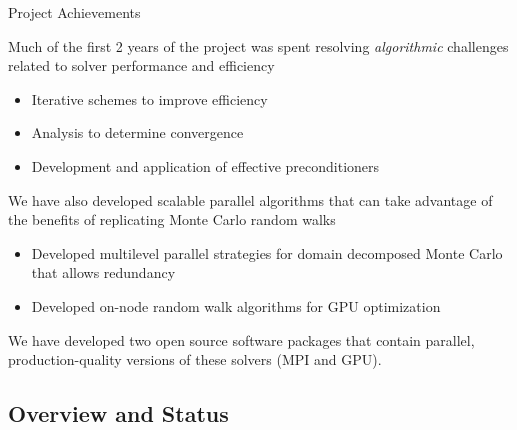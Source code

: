 \documentclass{beamer}
\begin{document}

\begin{frame}{Project Achievements}

  Much of the first 2 years of the project was spent resolving
  \textit{algorithmic} challenges related to solver performance and efficiency
  \begin{itemize}
  \item Iterative schemes to improve efficiency
  \item Analysis to determine convergence
  \item Development and application of effective preconditioners
  \end{itemize}

  \vfill

  We have also developed scalable parallel algorithms that can take advantage
  of the benefits of replicating Monte Carlo random walks
  \begin{itemize}
  \item Developed multilevel parallel strategies for domain decomposed Monte
    Carlo that allows redundancy
  \item Developed on-node random walk algorithms for GPU optimization
  \end{itemize}

  \vfill

  We have developed two open source software packages that contain
  parallel, production-quality versions of these solvers (MPI and GPU).

\end{frame}

\subsection{Overview and Status}
\end{document}
